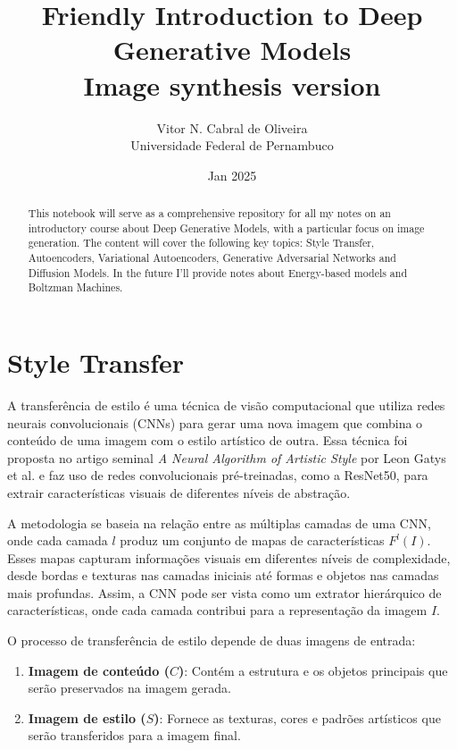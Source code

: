 \documentclass{article}
\title{Friendly Introduction to Deep Generative Models\\
Image synthesis version}
\author{Vitor N. Cabral de Oliveira\\
Universidade Federal de Pernambuco}
\date{Jan 2025}
\begin{document}
\maketitle

\begin{abstract}
   This notebook will serve as a comprehensive repository for all my notes on an introductory course about Deep Generative Models, with a particular focus on image generation. The content will cover the following key topics: Style Transfer, Autoencoders, Variational Autoencoders, Generative Adversarial Networks and Diffusion Models. In the future I'll provide notes about Energy-based models and Boltzman Machines.

\end{abstract}

\newpage
\tableofcontents
\newpage

\section{Style Transfer}

A transferência de estilo é uma técnica de visão computacional que utiliza redes neurais convolucionais (CNNs) para gerar uma nova imagem que combina o conteúdo de uma imagem com o estilo artístico de outra. Essa técnica foi proposta no artigo seminal \textit{A Neural Algorithm of Artistic Style} por Leon Gatys et al. e faz uso de redes convolucionais pré-treinadas, como a ResNet50, para extrair características visuais de diferentes níveis de abstração.

A metodologia se baseia na relação entre as múltiplas camadas de uma CNN, onde cada camada $l$ produz um conjunto de mapas de características $F^{l}(I)$. Esses mapas capturam informações visuais em diferentes níveis de complexidade, desde bordas e texturas nas camadas iniciais até formas e objetos nas camadas mais profundas. Assim, a CNN pode ser vista como um extrator hierárquico de características, onde cada camada contribui para a representação da imagem $I$.

O processo de transferência de estilo depende de duas imagens de entrada:
\begin{enumerate}
    \item \textbf{Imagem de conteúdo ($C$)}: Contém a estrutura e os objetos principais que serão preservados na imagem gerada.
    \item \textbf{Imagem de estilo ($S$)}: Fornece as texturas, cores e padrões artísticos que serão transferidos para a imagem final.
\end{enumerate}
\end{document}
